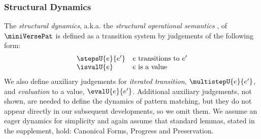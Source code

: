 \documentclass[acmsmall,10pt,review,anonymous]{acmart}\settopmatter{printfolios=true}
\begin{document}



\subsubsection{Structural Dynamics}\label{sec:dynamics-U}
The \emph{structural dynamics}, a.k.a. the \emph{structural operational semantics} \cite{DBLP:journals/jlp/Plotkin04a}, of $\miniVersePat$ is defined as a transition system by judgements of the following form:
\[\begin{array}{ll}
\stepsU{e}{e'} & \text{$e$ transitions to $e'$}\\
\isvalU{e} & \text{$e$ is a value}
\end{array}\]
We also define auxiliary judgements for \emph{iterated transition}, $\multistepU{e}{e'}$, and \emph{evaluation} to a value, $\evalU{e}{e'}$. Additional auxiliary judgements, not shown, are needed to define the dynamics of pattern matching, but they do not appear directly in our subsequent developments, so we omit them. We assume an eager dynamics for simplicity and again assume that standard lemmas, stated in the supplement, hold: Canonical Forms, Progress and Preservation. 
\end{document}

